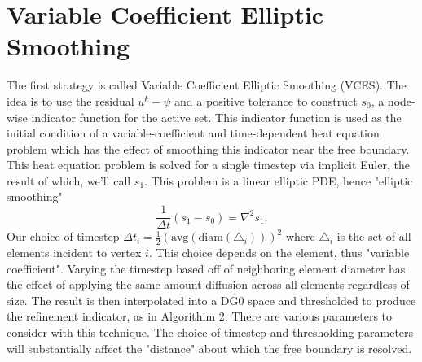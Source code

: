 \documentclass[12 pt]{report}
\begin{document}
\section{Variable Coefficient Elliptic Smoothing}
The first strategy is called Variable Coefficient Elliptic Smoothing (VCES). The idea is to use the residual $u^k - \psi$ and a positive tolerance to construct $s_0$, a node-wise indicator function for the active set. This indicator function is used as the initial condition of a variable-coefficient and time-dependent heat equation problem which has the effect of smoothing this indicator near the free boundary. This heat equation problem is solved for a single timestep via implicit Euler, the result of which, we'll call $s_1$. This problem is a linear elliptic PDE, hence "elliptic smoothing"
\begin{equation}
  \frac{1}{\Delta t}(s_1 - s_0) = \nabla^2 s_1.
\end{equation}
Our choice of timestep $\Delta t_i = \frac{1}{2}(\text{avg}(\text{diam}(\triangle_i)))^2$ where $\triangle_i$ is the set of all elements incident to vertex $i$. This choice depends on the element, thus "variable coefficient". Varying the timestep based off of neighboring element diameter has the effect of applying the same amount diffusion across all elements regardless of size. The result is then interpolated into a DG0 space and thresholded to produce the refinement indicator, as in Algorithim 2. There are various parameters to consider with this technique. The choice of timestep and thresholding parameters will substantially affect the "distance" about which the free boundary is resolved. 
\end{document}
